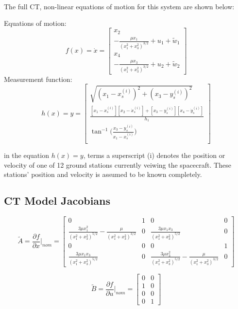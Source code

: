 \documentclass[11pt, a4paper]{article}
\begin{document}
The full CT, non-linear equations of motion for this system are shown below:


Equations of motion:
$$
f(x) = \dot{x} = 
\left[\begin{matrix}
x_2 \\
-\frac{\mu x_1}{(x_1^2 + x_3^2)^{3/2}} + u_1 + \tilde{w}_1 \\
x_4 \\
-\frac{\mu x_3}{(x_1^2 + x_3^2)^{3/2}} + u_2 + \tilde{w}_2
\end{matrix}\right]
$$
\indent Measurement function:
$$
h(x) = y = 
\left[\begin{matrix}
\sqrt{(x_1 - x^{(i)}_s)^2 + (x_3 - y^{(i)}_s)^2}\\
\frac{\left[x_1 - x^{(i)}_s\right]\left[x_2 - \dot{x}^{(i)}_s\right] + \left[x_3 - y^{(i)}_s\right]\left[x_4 - \dot{y}^{(i)}_s\right]}{h_1} \\
\tan^{-1}\big(\frac{x_3 - y^{(i)}_s}{x_1 - x^{(i)}_s} \big)\\
\end{matrix}\right]
$$

in the equation $h(x) = y$, terms a superscript (i) denotes the position or velocity of one of 12 ground stations currently veiwing the spacecraft. 
These stations' position and velocity is assumed to be known completely.


\subsection{CT Model Jacobians}

$$
\tilde{A} = \frac{\partial f}{\partial x} \biggr\rvert_{nom} = 
\left[\begin{matrix}0 & 1 & 0 & 0\\\frac{3\mu x_{1}^{2}}{\left(x_{1}^{2} + x_{3}^{2}\right)^{5/2}} - \frac{\mu}{\left(x_{1}^{2} + x_{3}^{2}\right)^{3/2}} & 0 & \frac{3\mu x_{1} x_{3}}{\left(x_{1}^{2} + x_{3}^{2}\right)^{5/2}} & 0\\0 & 0 & 0 & 1\\\frac{3\mu x_{1} x_{3}}{\left(x_{1}^{2} + x_{3}^{2}\right)^{5/2}} & 0 & \frac{3\mu x_{3}^{2}}{\left(x_{1}^{2} + x_{3}^{2}\right)^{5/2}} - \frac{\mu}{\left(x_{1}^{2} + x_{3}^{2}\right)^{3/2}} & 0\end{matrix}\right]
$$

$$
\tilde{B} = \frac{\partial f}{\partial u} \biggr\rvert_{nom} = 
\left[\begin{matrix}0 & 0\\1 & 0\\0 & 0\\0 & 1\end{matrix}\right]
$$
\end{document}
